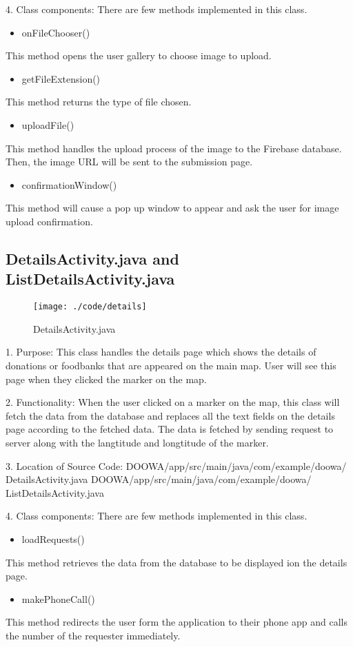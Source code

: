 \documentclass[conference]{IEEEtran}
\begin{document}
4. Class components: There are few methods implemented in this class.
\begin{itemize}
\item onFileChooser()
\end{itemize}
This method opens the user gallery to choose image to upload.
\begin{itemize}
\item getFileExtension()
\end{itemize}
This method returns the type of file chosen.
\begin{itemize}
\item uploadFile()
\end{itemize}
This method handles the upload process of the image to the Firebase database. Then, the image URL will be sent to the submission page.
\begin{itemize}
\item confirmationWindow()
\end{itemize}
This method will cause a pop up window to appear and ask the user for image upload confirmation.
\break
\subsection{DetailsActivity.java and ListDetailsActivity.java}
\begin{figure}[h!]
\texttt{[image: ./code/details]}
\centering
\caption{DetailsActivity.java}
\end{figure}
1. Purpose: This class handles the details page which shows the details of donations or foodbanks that are appeared on the main map. User will see this page when they clicked the marker on the map.\break
\par 2. Functionality: When the user clicked on a marker on the map, this class will fetch the data from the database and replaces all the text fields on the details page according to the fetched data. The data is fetched by sending request to server along with the langtitude and longtitude of the marker.\break

3. Location of Source Code: DOOWA/app/src/main/java/com/example/doowa/ DetailsActivity.java
DOOWA/app/src/main/java/com/example/doowa/ ListDetailsActivity.java\break

4. Class components: There are few methods implemented in this class.
\begin{itemize}
\item loadRequests()
\end{itemize}
This method retrieves the data from the database to be displayed ion the details page.
\begin{itemize}
\item makePhoneCall()
\end{itemize}
This method redirects the user form the application to their phone app and calls the number of the requester immediately.
\break
\end{document}
